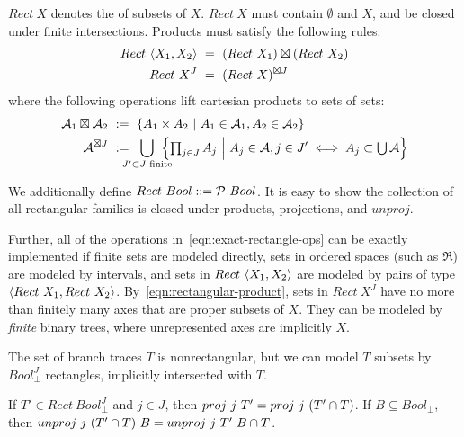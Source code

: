 \documentclass{llncs}
\begin{document}
\begin{definition}
\label{def:standard-rectangle}
$Rect~X$ denotes the  of subsets of $X$.
$Rect~X$ must contain $\emptyset$ and $X$, and be closed under finite intersections.
Products must satisfy the following rules:
\begin{align}
	Rect~\langle{X_1,X_2}\rangle &\ = \ (Rect~X_1) \boxtimes (Rect~X_2)
	\label{eqn:standard-rect-finite-product-rule}
\\
	Rect~X^J &\ = \ (Rect~X)^{\boxtimes J}
	\label{eqn:standard-rect-arbitrary-product-rule}
\end{align}
where the following operations lift cartesian products to sets of sets:
\begin{align}
	\A_1 \boxtimes \A_2 &\ := \ \setb{A_1 \times A_2}{A_1 \in \A_1, A_2 \in \A_2}
\\
	\A^{\boxtimes J} &\ := \ \!\!\!\!\!\!\!\displaystyle\bigcup_{J' \subset J \text{ finite}}\!\!\!\!\!\! \left\{\textstyle\prod_{j \in J} A_j\ \middle|\ A_j \in \A, j \in J' \iff A_j \subset \U\A\right\}
\label{eqn:rectangular-product}
\end{align}
\end{definition}

We additionally define $Rect~Bool ::= \mathcal{P}~Bool$.
It is easy to show the collection of all rectangular families is closed under products, projections, and $unproj$.

Further, all of the operations in~\eqref{eqn:exact-rectangle-ops} can be exactly implemented if finite sets are modeled directly, sets in ordered spaces (such as $\Re$) are modeled by intervals, and sets in $Rect~\langle{X_1,X_2}\rangle$ are modeled by pairs of type $\langle{Rect~X_1,Rect~X_2}\rangle$.
By~\eqref{eqn:rectangular-product}, sets in $Rect~X^J$ have no more than finitely many axes that are proper subsets of $X$.
They can be modeled by \emph{finite} binary trees, where unrepresented axes are implicitly $X$.

The set of branch traces $T$ is nonrectangular, but we can model $T$ subsets by $Bool_\bot^J$ rectangles, implicitly intersected with $T$.

\begin{theorem}[$T$ model]
If $T' \in Rect~Bool_\bot^J$ and $j \in J$, then $proj~j~T' = proj~j~(T' \cap T)$.
If $B \subseteq Bool_\bot$, then $unproj~j~(T' \cap T)~B = unproj~j~T'~B \cap T$.
\end{theorem}
\end{document}
